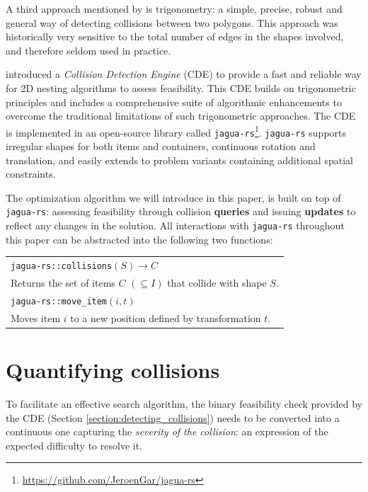 \documentclass[preprint, 11pt, authoryear]{elsarticle}
\begin{document}
A third approach mentioned by \citet{bennell2008geometry} is trigonometry: a simple, precise, robust and general way of detecting collisions between two polygons.
This approach was historically very sensitive to the total number of edges in the shapes involved, and therefore seldom used in practice.

\citet{gardeyn2025decoupling} introduced a \emph{Collision Detection Engine} (CDE) to provide a fast and reliable way for 2D nesting algorithms to assess feasibility.
This CDE builds on trigonometric principles and includes a comprehensive suite of algorithmic enhancements to overcome the traditional limitations of such trigonometric approaches.
The CDE is implemented in an open-source library called \texttt{jagua-rs}\footnote{\url{https://github.com/JeroenGar/jagua-rs}}.
\texttt{jagua-rs} supports irregular shapes for both items and containers, continuous rotation and translation, and easily extends to problem variants containing additional spatial constraints.

The optimization algorithm we will introduce in this paper, is built on top of \texttt{jagua-rs}: assessing feasibility through collision \textbf{queries} and issuing \textbf{updates} to reflect any changes in the solution.
All interactions with \texttt{jagua-rs} throughout this paper can be abstracted into the following two functions:
\begin{flushleft}
    \begin{tabular}{@{}l@{}} %
        \texttt{jagua-rs::collisions}$(S) \rightarrow C$ \\
        \quad Returns the set of items $C$ $(\subseteq I)$ that collide with shape $S$. 
        \\[1ex]
        \texttt{jagua-rs::move\_item}$(i, t)$ \\
        \quad Moves item $i$ to a new position defined by transformation $t$.
    \end{tabular}
\end{flushleft}

\section{Quantifying collisions} \label{section:quantifying_collisions}

To facilitate an effective search algorithm, the binary feasibility check provided by the CDE (Section \ref{section:detecting_collisions}) needs to be converted into a continuous one capturing the \emph{severity of the collision}: an expression of the expected difficulty to resolve it.
\end{document}
